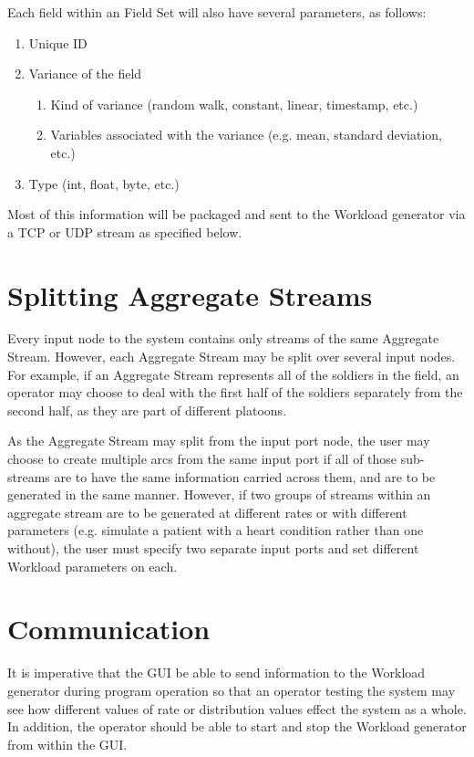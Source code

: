\documentclass[a4paper,12pt]{article}
\begin{document}
Each field within an Field Set will also have several parameters, as
follows:

\begin{enumerate}
\item Unique ID
\item Variance of the field
\begin{enumerate}
\item Kind of variance (random walk, constant, linear, timestamp, etc.)
\item Variables associated with the variance (e.g. mean, standard deviation,
etc.)
\end{enumerate}
\item Type (int, float, byte, etc.)
\end{enumerate}

Most of this information will be packaged and sent to the Workload generator via
a TCP or UDP stream as specified below.


\section*{Splitting Aggregate Streams}

Every input node to the system contains only streams of the same Aggregate
Stream. However, each Aggregate Stream may be split over several input nodes. 
For example, if an Aggregate Stream represents all of the soldiers in the field,
an operator may choose to deal with the first half of the soldiers separately 
from the second half, as they are part of different platoons. 

As the Aggregate Stream may split from the input port node, the user may choose
to create multiple arcs from the same input port if all of those sub-streams are
to have the same information carried across them, and are to be generated in the
same manner. However, if two groups of streams within an aggregate stream are to
be generated at different rates or with different parameters (e.g. simulate a
patient with a heart condition rather than one without), the user must specify
two separate input ports and set different Workload parameters on each.

\section*{Communication}

It is imperative that the GUI be able to send information to the Workload
generator during program operation so that an operator testing the system may
see how different values of rate or distribution values effect the system as a
whole. In addition, the operator should be able to start and stop the Workload
generator from within the GUI.
\end{document}
